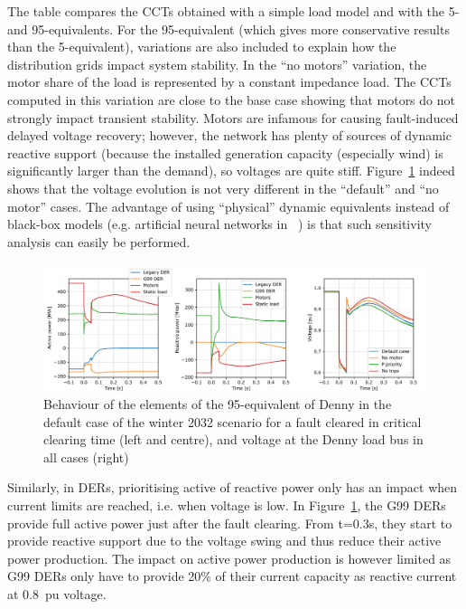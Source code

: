 The table compares the CCTs obtained with a simple load model and with the 5- and 95-equivalents. For the 95-equivalent (which gives more conservative results than the 5-equivalent), variations are also included to explain how the distribution grids impact system stability. In the ``no motors'' variation, the motor share of the load is represented by a constant impedance load. The CCTs computed in this variation are close to the base case showing that motors do not strongly impact transient stability. Motors are infamous for causing fault-induced delayed voltage recovery; however, the network has plenty of sources of dynamic reactive support (because the installed generation capacity (especially wind) is significantly larger than the demand), so voltages are quite stiff. Figure~\ref{fig:CIGRE_sensitivities} indeed shows that the voltage evolution is not very different in the ``default'' and ``no motor'' cases. The advantage of using ``physical'' dynamic equivalents instead of black-box models (e.g. artificial neural networks in ~\cite{Vorwerk}) is that such sensitivity analysis can easily be performed.

\begin{figure}
    \centering
    \includegraphics[width=\linewidth]{Figs/CIGRE_sensitivities.pdf}
    \caption{Behaviour of the elements of the 95-equivalent of Denny in the default case of the winter 2032 scenario for a fault cleared in critical clearing time (left and centre), and voltage at the Denny load bus in all cases (right)}
    \label{fig:CIGRE_sensitivities}
\end{figure}

Similarly, in DERs, prioritising active of reactive power only has an impact when current limits are reached, i.e. when voltage is low. In Figure~\ref{fig:CIGRE_sensitivities}, the G99 DERs provide full active power just after the fault clearing. From t=0.3s, they start to provide reactive support due to the voltage swing and thus reduce their active power production. The impact on active power production is however limited as G99 DERs only have to provide 20\% of their current capacity as reactive current at 0.8~pu voltage.

